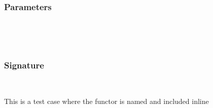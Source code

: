 \\
\label{Oxcaml--module-Include_functor_inline}\label{Oxcaml-Include_functor_inline}\begin{ocamlindent}\label{Oxcaml-Include_functor_inline--module-type-Make}\label{Oxcaml-Include_functor_inline-module-type-Make}\begin{ocamlindent}\subsubsection{Parameters\label{Oxcaml-Include_functor_inline-module-type-Make--parameters_10}}%
\label{Oxcaml-Include_functor_inline-module-type-Make--argument-1-_}\label{Oxcaml-Include_functor_inline-module-type-Make-argument-1-_}\begin{ocamlindent}\label{Oxcaml-Include_functor_inline-module-type-Make-argument-1-_--type-t}\\
\end{ocamlindent}%
\\
\subsubsection{Signature\label{Oxcaml-Include_functor_inline-module-type-Make--signature_10}}%
\label{Oxcaml-Include_functor_inline-module-type-Make--type-included}\\
\end{ocamlindent}%
\begin{ocamlindent}This is a test case where the functor is named and included inline\end{ocamlindent}%
\medbreak
\label{Oxcaml-Include_functor_inline--type-t}\\
 \hyperref[Oxcaml-Include_functor_inline-module-type-Make]{}\label{Oxcaml-Include_functor_inline--type-included}\\
\end{ocamlindent}%
